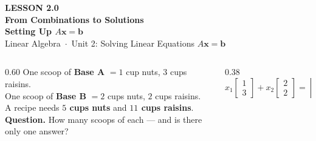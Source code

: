 \documentclass[aspectratio=169, 11pt]{beamer}
\newcommand{\xx}{\mathbf{x}}
\newcommand{\bb}{\mathbf{b}}
\begin{document}
{
\begin{frame}[plain]
  \vspace{2.8cm}\hspace{0.55cm}%
  \begin{minipage}{0.9\textwidth}
    {\color{goldacc}\bfseries\small LESSON 2.0}\\[0.5cm]
    {\color{white}\bfseries\LARGE From Combinations to Solutions}\\[0.3cm]
    {\color{white}\bfseries\large Setting Up $A\xx=\bb$}\\[1.0cm]
    {\color{blushmid}\small Linear Algebra~$\cdot$~Unit 2: Solving Linear Equations $A\xx=\bb$}
  \end{minipage}
\end{frame}
}

\begin{frame}[t, plain]
  \begin{columns}[T]
    \begin{column}{0.60\textwidth}
      One scoop of \textbf{Base A} $=1$ cup nuts, $3$ cups raisins.\\[4pt]
      One scoop of \textbf{Base B} $=2$ cups nuts, $2$ cups raisins.\\[8pt]
      A recipe needs \textbf{$5$ cups nuts} and \textbf{$11$ cups raisins}.\\[10pt]
      \textbf{Question.} How many scoops of each --- and is there only one answer?
    \end{column}
    \begin{column}{0.38\textwidth}
      \centering
      \[
        x_1\begin{bmatrix} 1 \\ 3 \end{bmatrix}
        + x_2\begin{bmatrix} 2 \\ 2 \end{bmatrix}
        = \begin{bmatrix} 5 \\ 11 \end{bmatrix}
      \]
    \end{column}
  \end{columns}
\end{frame}
\end{document}
